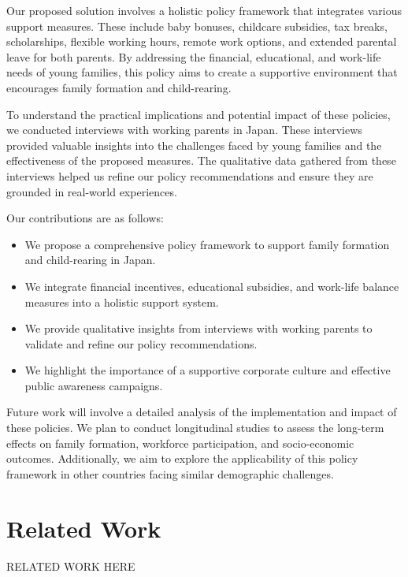 \documentclass{article} %
\begin{document}
Our proposed solution involves a holistic policy framework that integrates various support measures. These include baby bonuses, childcare subsidies, tax breaks, scholarships, flexible working hours, remote work options, and extended parental leave for both parents. By addressing the financial, educational, and work-life needs of young families, this policy aims to create a supportive environment that encourages family formation and child-rearing.

To understand the practical implications and potential impact of these policies, we conducted interviews with working parents in Japan. These interviews provided valuable insights into the challenges faced by young families and the effectiveness of the proposed measures. The qualitative data gathered from these interviews helped us refine our policy recommendations and ensure they are grounded in real-world experiences.

Our contributions are as follows:
\begin{itemize}
    \item We propose a comprehensive policy framework to support family formation and child-rearing in Japan.
    \item We integrate financial incentives, educational subsidies, and work-life balance measures into a holistic support system.
    \item We provide qualitative insights from interviews with working parents to validate and refine our policy recommendations.
    \item We highlight the importance of a supportive corporate culture and effective public awareness campaigns.
\end{itemize}

Future work will involve a detailed analysis of the implementation and impact of these policies. We plan to conduct longitudinal studies to assess the long-term effects on family formation, workforce participation, and socio-economic outcomes. Additionally, we aim to explore the applicability of this policy framework in other countries facing similar demographic challenges.

\section{Related Work}
\label{sec:related}
RELATED WORK HERE
\end{document}
